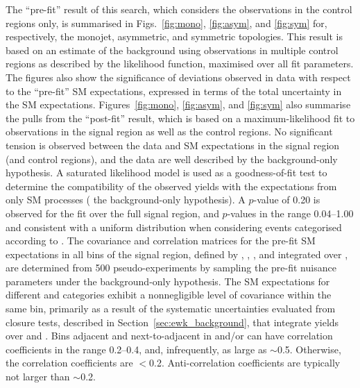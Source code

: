The ``pre-fit'' result of this search, which considers the
observations in the control regions only, is summarised in
Figs.~\ref{fig:mono}, \ref{fig:asym}, and \ref{fig:sym} for,
respectively, the monojet, asymmetric, and symmetric topologies. This
result is based on an estimate of the \znunuj background using
observations in multiple control regions as described by the
likelihood function, maximised over all fit parameters. The figures
also show the significance of deviations observed in data with respect
to the ``pre-fit'' SM expectations, expressed in terms of the total
uncertainty in the SM expectations. Figures~\ref{fig:mono},
\ref{fig:asym}, and \ref{fig:sym} also summarise the pulls from the
``post-fit'' result, which is based on a maximum-likelihood fit to
observations in the signal region as well as the control regions. No
significant tension is observed between the data and SM expectations
in the signal region (and control regions), and the data are well
described by the background-only hypothesis. A saturated likelihood
model %
is used as a goodness-of-fit test to determine the compatibility of
the observed yields with the expectations from only SM processes (\ie
the background-only hypothesis). A $p$-value of 0.20 is observed for
the fit over the full signal region, and $p$-values in the range
0.04--1.00 and consistent with a uniform distribution when considering
events categorised according to \njet. 
The covariance and correlation matrices for the pre-fit SM
expectations in all bins of the signal region, defined by \njet, \nb,
\scalht, and integrated over \HTmiss, are determined from 500
pseudo-experiments by sampling the pre-fit nuisance parameters under
the background-only hypothesis. The SM expectations for different
\njet and \nb categories exhibit a nonnegligible level of covariance
within the same \scalht bin, primarily as a result of the systematic
uncertainties evaluated from closure tests, described in
Section~\ref{sec:ewk_background}, that integrate yields over \njet and
\nb. Bins adjacent and next-to-adjacent in \njet and/or \nb can have
correlation coefficients in the range 0.2--0.4, and, infrequently, as
large as $\sim$0.5. Otherwise, the correlation coefficients are
$<$0.2. Anti-correlation coefficients are typically not larger than
$\sim$0.2.

%
%
%

